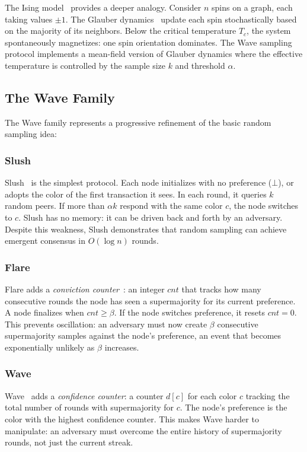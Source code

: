 The Ising model~\cite{ising1925beitrag} provides a deeper analogy. Consider $n$ spins on a
graph, each taking values $\pm 1$. The Glauber dynamics~\cite{glauber1963time} update each
spin stochastically based on the majority of its neighbors. Below the critical temperature
$T_c$, the system spontaneously magnetizes: one spin orientation dominates. The Wave
sampling protocol implements a mean-field version of Glauber dynamics where the effective
temperature is controlled by the sample size $k$ and threshold $\alpha$.

\subsection{The Wave Family}

The Wave family represents a progressive refinement of the basic random sampling idea:

\subsubsection{Slush}
Slush~\cite{rocket2019wave} is the simplest protocol. Each node initializes with no
preference ($\bot$), or adopts the color of the first transaction it sees. In each round,
it queries $k$ random peers. If more than $\alpha k$ respond with the same color $c$, the
node switches to $c$. Slush has no memory: it can be driven back and forth by an adversary.
Despite this weakness, Slush demonstrates that random sampling can achieve emergent
consensus in $O(\log n)$ rounds.

\subsubsection{Flare}
Flare adds a \emph{conviction counter}~\cite{rocket2019wave}: an integer $cnt$
that tracks how many consecutive rounds the node has seen a supermajority for its current
preference. A node finalizes when $cnt \geq \beta$. If the node switches preference, it
resets $cnt = 0$. This prevents oscillation: an adversary must now create $\beta$
consecutive supermajority samples against the node's preference, an event that becomes
exponentially unlikely as $\beta$ increases.

\subsubsection{Wave}
Wave~\cite{rocket2019wave} adds a \emph{confidence counter}: a counter $d[c]$ for
each color $c$ tracking the total number of rounds with supermajority for $c$. The node's
preference is the color with the highest confidence counter. This makes Wave harder to
manipulate: an adversary must overcome the entire history of supermajority rounds, not just
the current streak.

